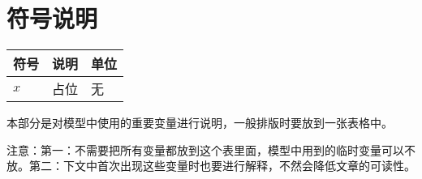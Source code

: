 \section{符号说明}
\begin{table}[H]
    \centering
    \begin{tabular}{p{}p{}p{}}
        \toprule
        符号 & 说明 & 单位 \\
        \midrule
        $x$ & 占位 & 无 \\
        \bottomrule
    \end{tabular}
\end{table}
本部分是对模型中使用的重要变量进行说明，一般排版时要放到一张表格中。\par
注意：第一：不需要把所有变量都放到这个表里面，模型中用到的临时变量可以不放。第二：下文中首次出现这些变量时也要进行解释，不然会降低文章的可读性。
